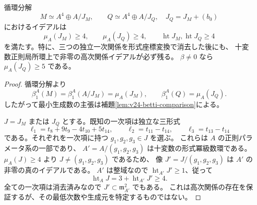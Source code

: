 \begin{proposition}\label{prop:v24-height-four}
循環分解
\[
 M\simeq A^4\oplus A/J_M,\qquad
 Q\simeq A^4\oplus A/J_Q,
 \quad J_Q=J_M+(b_0)
\]
におけるイデアルは
\[
 \mu_A(J_M)\ge4,\qquad\mu_A(J_Q)\ge4,
 \qquad \operatorname{ht}J_M,\operatorname{ht}J_Q\ge4
\]
を満たす。特に、三つの独立一次関係を形式座標変換で消去した後にも、
十変数正則局所環上で非零の高次関係イデアルが必ず残る。
$\beta\ne0$ なら $\mu_A(J_Q)\ge5$ である。
\end{proposition}

\begin{proof}
循環分解より
\[
 \beta_1^A(M)=\beta_1^A(A/J_M)=\mu_A(J_M),\qquad
 \beta_1^A(Q)=\mu_A(J_Q).
\]
したがって最小生成数の主張は補題\ref{lem:v24-betti-comparison}による。

$J=J_M$ または $J_Q$ とする。既知の一次項は独立な三形式
\[
 \ell_1=t_8+9t_9-4t_{10}+5t_{14},\qquad
 \ell_2=t_{11}-t_{14},\qquad \ell_3=t_{13}-t_{14}
\]
である。それぞれを一次項に持つ $g_1,g_2,g_3\in J$ を選ぶ。
これらは $A$ の正則パラメータ系の一部であり、
$A'=A/(g_1,g_2,g_3)$ は十変数の形式冪級数環である。
$\mu_A(J)\ge4$ より $J\ne(g_1,g_2,g_3)$ であるため、
像 $J'=J/(g_1,g_2,g_3)$ は $A'$ の非零の真のイデアルである。
$A'$ は整域なので $\operatorname{ht}_{A'}J'\ge1$、従って
\[
 \operatorname{ht}_A J=3+\operatorname{ht}_{A'}J'\ge4.
\]
全ての一次項は消去済みなので $J'\subset\mathfrak m_{A'}^2$ でもある。
これは高次関係の存在を保証するが、その最低次数や生成元を特定するものではない。
\end{proof}

